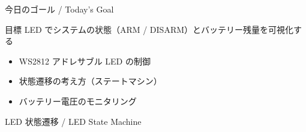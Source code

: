 \documentclass[aspectratio=169, 14pt]{beamer}
\begin{document}
\begin{frame}
  \titlepage
\end{frame}

\begin{frame}{今日のゴール / Today's Goal}
  \begin{block}{目標}
    LED でシステムの状態（ARM / DISARM）とバッテリー残量を可視化する
  \end{block}

  \vspace{1em}

  \begin{itemize}
    \item WS2812 アドレサブル LED の制御
    \item 状態遷移の考え方（ステートマシン）
    \item バッテリー電圧のモニタリング
  \end{itemize}
\end{frame}

\begin{frame}{LED 状態遷移 / LED State Machine}
  \begin{center}
    \resizebox{0.95\linewidth}{!}{}
  \end{center}
\end{frame}
\end{document}
